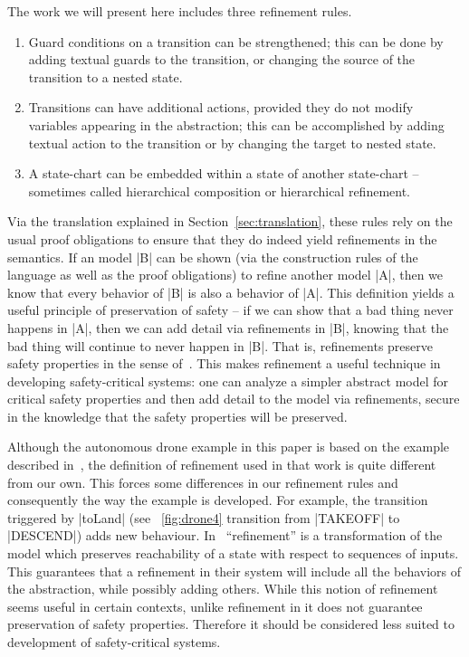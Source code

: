 

The work we will present here includes three refinement rules.
\begin{enumerate}
\item Guard conditions on a transition can be strengthened; 
this can be done by adding textual guards to the transition, or
changing the source of the transition to a nested state.
\item Transitions can have additional actions, provided they do not
  modify variables appearing in the abstraction; this can be 
  accomplished by adding textual action to the transition 
  or by changing the target to nested state.
\item A state-chart can be embedded within a state of another
  state-chart -- sometimes called hierarchical composition or
  hierarchical refinement.
\end{enumerate}
Via the translation explained in Section~\ref{sec:translation}, these rules
rely on the usual \EventB proof obligations to ensure that they do
indeed yield refinements in the \EventB semantics.
If an \EventB model |B| can be shown (via the construction rules of
the \EventB language as well as the proof obligations) to refine
another \EventB model |A|, then we know that every behavior of |B| is
also a behavior of |A|. This definition yields a useful principle of
preservation of safety -- if we can show that a bad thing never
happens in |A|, then we can add detail via refinements in |B|, knowing
that the bad thing will continue to never happen in |B|. That is,
\EventB refinements preserve safety properties in the sense
of~\cite{lamport1977proving}. This makes refinement a useful technique
in developing safety-critical systems: one can analyze a simpler
abstract model for critical safety properties and then add detail to
the model via refinements, secure in the knowledge that the safety
properties will be preserved.

Although the autonomous drone example in this paper is based on the
example described in~\cite{Syriani_2019}, the definition of refinement
used in that work is quite different from our own. This forces some
differences in our refinement rules and consequently the way the
example is developed. For example, the transition triggered by |toLand| 
(see ~\ref{fig:drone4} transition from |TAKEOFF| to |DESCEND|) 
adds new behaviour.
In~\cite{Syriani_2019} ``refinement'' is a
transformation of the model which preserves reachability of a state
with respect to sequences of inputs. This guarantees that a refinement
in their system will include all the behaviors of the abstraction,
while possibly adding others. While this notion of refinement seems
useful in certain contexts, unlike refinement in \EventB it does not
guarantee preservation of safety properties. Therefore it should be
considered less suited to development of safety-critical systems.

